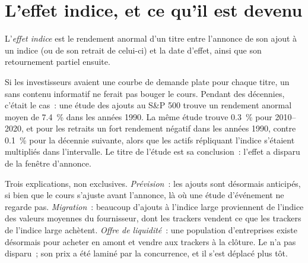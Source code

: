 \section{L'effet indice, et ce qu'il est devenu}

\begin{definition}\label{def:m1:index-construction-and-rebalancing:effect}
L'\emph{effet indice} est le rendement anormal
d'un titre entre l'annonce de son ajout à un indice (ou de son retrait de celui-ci) et
la date d'effet, ainsi que son retournement partiel ensuite.
\end{definition}

Si les investisseurs avaient une courbe de demande plate pour chaque titre, un 
sans contenu informatif ne ferait pas bouger le cours. Pendant des décennies, c'était le cas~: une étude
des ajouts au S\&P 500 trouve un rendement anormal moyen de 7.4~\% dans les
années 1990. La même étude trouve 0.3~\% pour 2010--2020, et pour les retraits un fort
rendement négatif dans les années 1990, contre 0.1~\% pour la décennie suivante, alors que
les actifs répliquant l'indice s'étaient multipliés dans l'intervalle. Le titre de l'étude
est sa conclusion~: l'effet a disparu de la fenêtre d'annonce.

Trois explications, non exclusives. \emph{Prévision}~: les ajouts sont désormais anticipés, si bien
que le cours s'ajuste avant l'annonce, là où une étude d'événement
ne regarde pas. \emph{Migration}~: beaucoup d'ajouts à l'indice large
proviennent de l'indice des valeurs moyennes du fournisseur, dont les trackers vendent ce que
les trackers de l'indice large achètent. \emph{Offre de liquidité}~: une population
d'entreprises existe désormais pour acheter en amont et vendre aux trackers à la clôture. Le
 n'a pas disparu~; son prix a été laminé par la concurrence, et
il s'est déplacé plus tôt.

